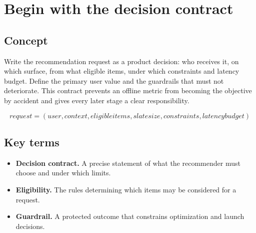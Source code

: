 \section{Begin with the decision contract}

\begin{abstract}
Name the user, moment, eligible catalogue, slate and value before choosing a model.
\end{abstract}

\subsection{Concept}
Write the recommendation request as a product decision: who receives it, on which surface, from what eligible items, under which constraints and latency budget. Define the primary user value and the guardrails that must not deteriorate. This contract prevents an offline metric from becoming the objective by accident and gives every later stage a clear responsibility.

\begin{equation*}
request = (user, context, eligible items, slate size, constraints, latency budget)
\end{equation*}

\subsection{Key terms}
\begin{itemize}
\item \textbf{Decision contract.} A precise statement of what the recommender must choose and under which limits.
\item \textbf{Eligibility.} The rules determining which items may be considered for a request.
\item \textbf{Guardrail.} A protected outcome that constrains optimization and launch decisions.
\end{itemize}
